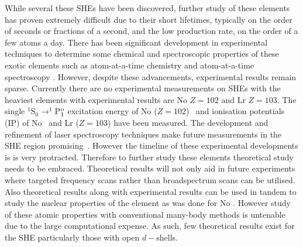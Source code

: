 \documentclass[10pt,a4paper, twoside, openright]{report}
\begin{document}
While several these SHEs have been discovered, further study of these elements has proven extremely difficult due to their short lifetimes, typically on the order of seconds or fractions of a second, and the low production rate, on the order of a few atoms a day\cite{Dullmann2017}. There has been significant development in experimental techniques to determine some chemical and spectroscopic properties of these exotic elements such as atom-at-a-time chemistry \cite{Dullmann2017, Nagame2015, Turler2013} and atom-at-a-time spectroscopy \cite{Backe2015}. However, despite these advancements, experimental results remain sparse. Currently there are no experimental measurements on SHEs with the heaviest elements with experimental results are No $Z=102$ and Lr $Z=103$. The single $^1$S$_0 \rightarrow ^1$P$^{\rm o}_1$ excitation energy of No  ($Z=102$)~\cite{Laatiaoui2016, Chhetri2018} and ionisation potentials (IP) of No~\cite{Laatiaoui2016} and Lr ($Z=103$) \cite{SAB15} have been measured. The development and refinement of laser spectroscopy techniques make future measurements in the SHE region promising~\cite{Laatiaoui2014, Laatiaoui20161, Ferrer2017}. However the timeline of these experimental developments is is very protracted. Therefore to further study these elements theoretical study needs to be embraced. Theoretical results will not only aid in future experiments where targeted frequency scans rather than broadspectrum scans can be utilised. Also theoretical results along with experimental results can be used in tandem to study the nuclear properties of the element as was done for No \cite{Borchevsky2007, Laatiaoui2016}. However study of these atomic properties with conventional many-body methods is untenable due to the large computational expense. As such, few theoretical results exist for the SHE particularly those with open $d-$shells.\\
\linebreak
\end{document}
